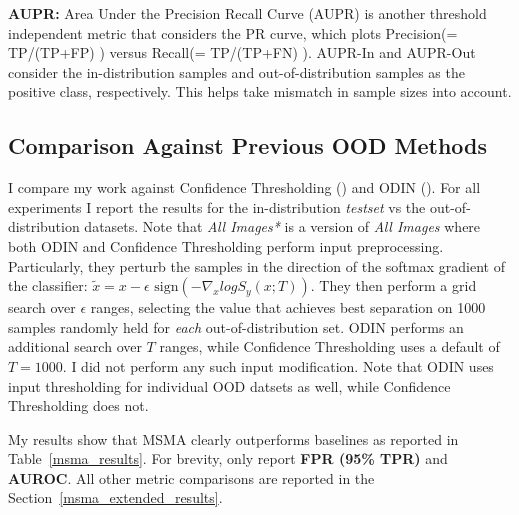 \textbf{AUPR:} Area Under the Precision Recall Curve (AUPR) is another threshold independent metric that considers the PR curve, which plots Precision(= TP/(TP+FP) ) versus Recall(= TP/(TP+FN) ). AUPR-In and AUPR-Out consider the in-distribution samples and out-of-distribution samples as the positive class, respectively. This helps take mismatch in sample sizes into account.

\subsection*{Comparison Against Previous OOD Methods}
\label{ood_experiments}

I compare my work against Confidence Thresholding (\cite{Devries}) and ODIN (\cite{Liang2017}). For all experiments I report the results for the in-distribution \textit{testset} vs the out-of-distribution datasets. Note that \textit{All Images*} is a version of \textit{All Images} where both ODIN and Confidence Thresholding perform input preprocessing. Particularly, they perturb the samples in the direction of the softmax gradient of the classifier:
$\tilde{x} = x - \epsilon \text{ sign} (- \nabla_x log S_y(x;T))$.
They then perform a grid search over $\epsilon$ ranges, selecting the value that achieves best separation on 1000 samples randomly held for \textit{each} out-of-distribution set. ODIN performs an additional search over $T$ ranges, while Confidence Thresholding uses a default of $T=1000$. I did not perform any such input modification. Note that ODIN uses input thresholding for individual OOD datsets as well, while Confidence Thresholding does not. 

My results show that MSMA clearly outperforms baselines as reported in Table~\ref{msma_results}. For brevity, only report \textbf{ FPR (95\% TPR)} and \textbf{AUROC}. All other metric comparisons are reported in the Section~\ref{msma_extended_results}. 

